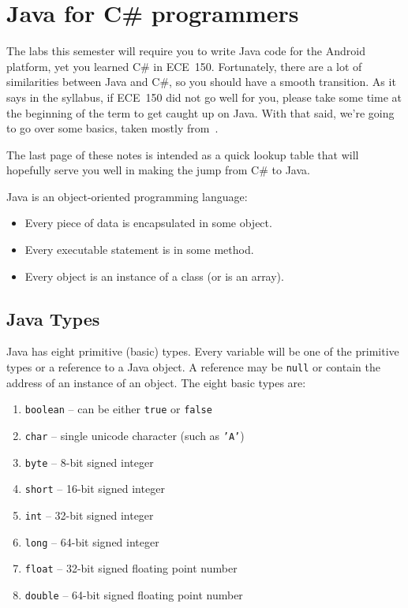 




\section*{Java for C\# programmers}
The labs this semester will require you to write Java
code for the Android platform, yet you learned C\# in ECE~150.
Fortunately, there are a lot of similarities between Java and C\#,
so you should have a smooth transition. As it says in the syllabus, if ECE~150 did not go well for you, please take some time at the beginning of the term to get caught up on Java.  With that said, we're going to go over some basics, taken mostly from~\cite{dswj}. 

The last page of these notes is intended as a quick lookup table that will hopefully serve you well in making the jump from C\# to Java.

Java is an object-oriented programming language: 
\begin{itemize}
\item Every piece of data is encapsulated in some object.
\item Every executable statement is in some method.
\item Every object is an instance of a class (or is an array).
\end{itemize}

\subsection*{Java Types}
Java has eight primitive (basic) types. Every variable will be one of the primitive types or a reference to a Java object. A reference may be \texttt{null} or contain the address of an instance of an object. The eight basic types are:

\begin{enumerate}
\item \texttt{boolean} -- can be either \texttt{true} or \texttt{false}
\item \texttt{char} -- single unicode character (such as \texttt{'A'})
\item \texttt{byte} -- 8-bit signed integer
\item \texttt{short} -- 16-bit signed integer
\item \texttt{int} -- 32-bit signed integer
\item \texttt{long} -- 64-bit signed integer
\item \texttt{float} -- 32-bit signed floating point number
\item \texttt{double} -- 64-bit signed floating point number
\end{enumerate}


